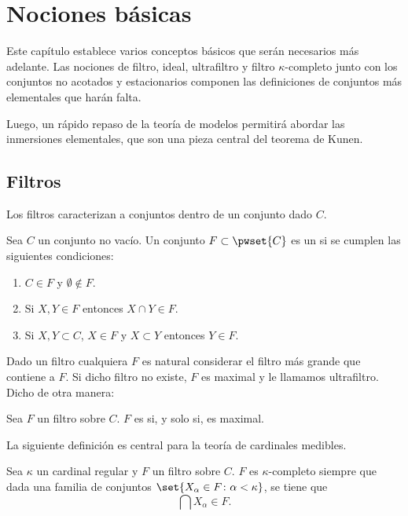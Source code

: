 \chapter{Nociones básicas}

Este capítulo establece varios conceptos básicos que serán necesarios
más adelante. Las nociones de filtro, ideal, ultrafiltro y filtro $\kappa$-completo
junto con los conjuntos no acotados y estacionarios componen las definiciones de
conjuntos más elementales que harán falta.

Luego, un rápido repaso de la teoría de modelos permitirá abordar las inmersiones
elementales, que son una pieza central del teorema de Kunen.

\section{Filtros}

Los filtros caracterizan a conjuntos  dentro
de un conjunto dado $C$.
\begin{defi}
    Sea $C$ un conjunto no vacío. Un conjunto $F\subset \pwset{C}$ es un
     si se cumplen las siguientes condiciones:
    \begin{enumerate}[label=\alph*)]
        \item $C\in F$ y $\emptyset\notin F$.
        \item Si $X,Y\in F$ entonces $X\cap Y\in F$.
        \item Si $X,Y\subset C$, $X\in F$ y $X\subset Y$ entonces $Y\in F$.
    \end{enumerate}
\end{defi}

Dado un filtro cualquiera $F$ es natural considerar el filtro más grande
que contiene a $F$. Si dicho filtro no existe, $F$ es maximal y le llamamos ultrafiltro.
Dicho de otra manera:

\begin{defi}
    Sea $F$ un filtro sobre $C$. $F$ es  si, y solo si, es maximal.
\end{defi}

La siguiente definición es central para la teoría de cardinales medibles.

\begin{defi}
    Sea $\kappa$ un cardinal regular y $F$ un filtro sobre $C$.
    $F$ es $\kappa$-completo siempre que dada una familia de conjuntos
    $\set{X_\alpha\in F\colon \alpha<\kappa}$,
    se tiene que
    \[
        \bigcap X_\alpha \in F.
    \]
\end{defi}

